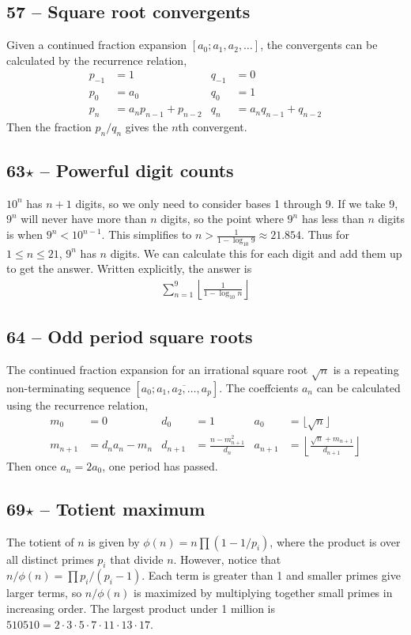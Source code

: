 \documentclass{article}
\begin{document}
\subsection*{57 -- Square root convergents} 
Given a continued fraction expansion $[a_0; a_1, a_2, \dotsc]$, the convergents can be calculated by the recurrence relation,
\begin{align*}
	p_{-1} &= 1 & q_{-1} &= 0 \\ 
	p_0 &= a_0 & q_0 &= 1 \\ 
	p_n &= a_n p_{n-1} + p_{n-2} & q_n &= a_n q_{n-1} + q_{n-2} 
\end{align*}
Then the fraction $p_n/q_n$ gives the $n$th convergent.

\subsection*{63$\star$ -- Powerful digit counts} 
$10^n$ has $n+1$ digits, so we only need to consider bases 1 through 9. 
If we take 9, $9^n$ will never have more than $n$ digits, so the point where $9^n$ has less than $n$ digits is when $9^n < 10^{n-1}$. 
This simplifies to $n > \frac{1}{1 - \log_{10}9} \approx 21.854$. 
Thus for $1 \leq n \leq 21$, $9^n$ has $n$ digits. 
We can calculate this for each digit and add them up to get the answer. Written explicitly, the answer is 
\begin{align*}
	\boxed{ \sum\limits_{n=1}^9 \left\lfloor \frac{1}{1 - \log_{10} n} \right\rfloor } 
\end{align*}

\subsection*{64 -- Odd period square roots} 
The continued fraction expansion for an irrational square root $\sqrt{n}$ is a repeating non-terminating sequence $[a_0; \overline{a_1, a_2, \dotsc, a_p}]$.
The coeffcients $a_n$ can be calculated using the recurrence relation,
\begin{align*}
	m_0 &= 0 & d_0 &= 1 & a_0 &= \lfloor \sqrt{n} \rfloor \\
	m_{n+1} &= d_na_n - m_n  &  d_{n+1} &= \frac{n - m_{n+1}^2}{d_n} & a_{n+1} &= \left\lfloor \frac{\sqrt{n} + m_{n+1}}{d_{n+1}} \right\rfloor 
\end{align*}
Then once $a_n = 2a_0$, one period has passed.

\subsection*{69$\star$ -- Totient maximum} 
The totient of $n$ is given by $\phi(n) =n \prod (1-1/p_i)$, where the product is over all distinct primes $p_i$ that divide $n$. 
However, notice that $n/\phi(n) = \prod p_i/(p_i -1)$. 
Each term is greater than 1 and smaller primes give larger terms, so $n/\phi(n)$ is maximized by multiplying together small primes in increasing order. The largest product under 1 million is $\boxed{510510} = 2 \cdot 3\cdot5\cdot7\cdot11\cdot13\cdot17$.
\end{document}

